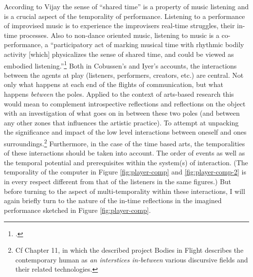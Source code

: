 According to Vijay \citeauthor{iyer08} the sense of ``shared time'' is a property of music listening and is a crucial aspect of the temporality of performance. Listening to a performance of improvised music is to experience the improvisers real-time struggles, their in-time processes. Also to non-dance oriented music, listening to music is a co-performance, a ``participatory act of marking musical time with rhythmic bodily activity [which] physicalizes the sense of shared time, and could be viewed as embodied listening.''\footcite[276]{iyer08} Both in Cobussen's and Iyer's accounts, the interactions between the agents at play (listeners, performers, creators, etc.) are central. Not only what happens at each end of the flights of communication, but what happens \emph{between} the poles. Applied to the context of arts-based research this would mean to complement introspective reflections and reflections on the object with an investigation of what goes on in between these two poles (and between any other zones that influences the artistic practice). To attempt at unpacking the significance and impact of the low level interactions between oneself and ones surroundings.\footnote{Cf Chapter 11, in which the described project Bodies in Flight describes the contemporary human as \emph{an interstices in-between} various discursive fields and their related
technologies.} Furthermore, in the case of the time based arts, the temporalities of these interactions should be taken into account. The order of events as well as the temporal potential and prerequisites within the system(s) of interaction. (The temporality of the computer in Figure \ref{fig:player-comp} and \ref{fig:player-comp-2} is in every respect different from that of the listeners in the same figures.) But before turning to the aspect of multi-temporality within these interactions, I will again briefly turn to the nature of the in-time reflections in the imagined performance sketched in Figure \ref{fig:player-comp}.

